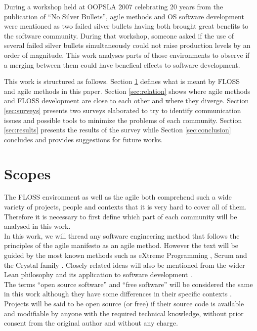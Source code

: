 \documentclass[lnbip]{svmultln}
\begin{document}
During a workshop \cite{conference:oopsla2007} held at OOPSLA 2007
celebrating 20 years from the publication of ``No Silver
Bullets''\cite{brooks1987}, agile methods and OS software development
were mentioned as two failed silver bullets having both brought great
benefits to the software community. During that workshop, someone
asked if the use of several failed silver bullets simultaneously could
not raise production levels by an order of magnitude. This work
analyses parts of those environments to observe if a merging between
them could have benefical effects to software development.

This work is structured as follows. Section \ref{sec:scope} defines
what is meant by FLOSS and agile methods in this paper. Section
\ref{sec:relation} shows where agile methods and FLOSS development are
close to each other and where they diverge. Section \ref{sec:surveys}
presents two surveys elaborated to try to identify communication
issues and possible tools to minimize the problems of each
community. Section \ref{sec:results} presents the results of the
survey while Section \ref{sec:conclusion} concludes and provides
suggestions for future works.

\section{Scopes}
\label{sec:scope}

The FLOSS environment as well as the agile both comprehend such a wide
variety of projects, people and contexts that it is very hard to cover
all of them. Therefore it is necessary to first define which part of
each community will be analysed in this work.
\\

In this work, we will thread any software engineering method that
follows the principles of the agile manifesto
\cite{url:agilemanifesto} as an agile method. However the text will be
guided by the most known methods such as eXtreme Programming
\cite{XP2002}, Scrum \cite{schwaber2004} and the Crystal family
\cite{cockburn2002}. Closely related ideas will also be mentioned from
the wider Lean philosophy \cite{ohno1998} and its application to
software development \cite{poppendieck2005}.
\\

The terms ``open source software'' and ``free software'' will be
considered the same in this work although they have some differences
in their specific contexts \cite{fogel2005}. Projects will be said to
be open source (or free) if their source code is available and
modifiable by anyone with the required technical knowledge, without
prior consent from the original author and without any charge.
\end{document}
